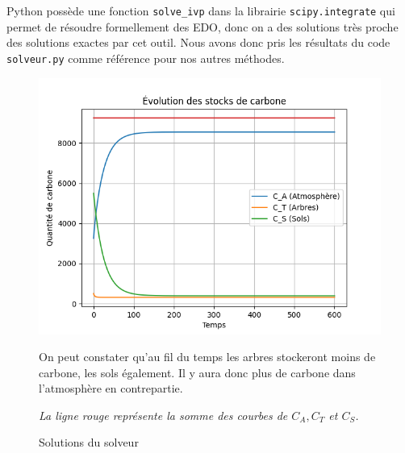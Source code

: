 \documentclass[12pt]{article}
\theoremstyle{saav}
\newcommand{\red}{\color{red}}
\begin{document}
	Python possède une fonction \texttt{solve\_ivp} dans la librairie \texttt{scipy.integrate} qui permet de résoudre formellement des EDO, donc on a des solutions très proche des solutions exactes par cet outil. Nous avons donc pris les résultats du code \texttt{solveur.py} comme référence pour nos autres méthodes.
%			
%		
\begin{figure}[htbp]
	\centering
	\begin{minipage}[t]{0.48\textwidth}
		\vspace{0pt} %
		\centering
		\includegraphics[width=\linewidth]{images/solveur_solutions2.png}
		\caption{Solutions du solveur}
		\label{fig:solveur}
	\end{minipage}%
	\hfill
	\begin{minipage}[t]{0.48\textwidth}
		\hspace{3mm} 
		\begin{flushleft} 
			\small
			On peut constater qu'au fil du temps les arbres stockeront moins de carbone, les sols également. Il y aura donc plus de carbone dans l'atmosphère en contrepartie.
			
			\textit{ \red La ligne rouge représente la somme des courbes de $C_{A},C_{T}$ et $C_{S}$.}
		\end{flushleft}
	\end{minipage}
\end{figure}
\end{document}
